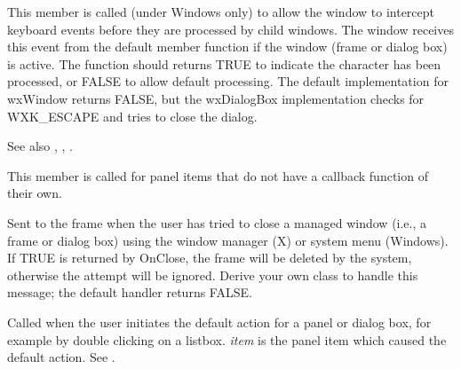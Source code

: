 \label{wxevthandleroncharhook}


This member is called (under Windows only) to allow the window to intercept keyboard events
before they are processed by child windows. The window receives this event from
the default  member function if the window
(frame or dialog box) is active. The function should returns TRUE to indicate the
character has been processed, or FALSE to allow default processing. The default
implementation for wxWindow returns FALSE, but the wxDialogBox implementation
checks for WXK\_ESCAPE and tries to close the dialog.

See also , ,\rtfsp
{}.

\label{wxevthandleroncommand}


This member is called for panel items that do not have a callback function
of their own.

\label{wxevthandleronclose}

Sent to the frame when the user has tried to close a managed window (i.e., a frame
or dialog box) using the window manager (X) or system menu (Windows).  If TRUE is returned by
OnClose, the frame will be deleted by the system, otherwise the
attempt will be ignored. Derive your own class to handle this message;
the default handler returns FALSE.


\label{wxevthandlerondefaultaction}


Called when the user initiates the default action for a panel or
dialog box, for example by double clicking on a listbox. {\it item}
is the panel item which caused the default action.
See .



